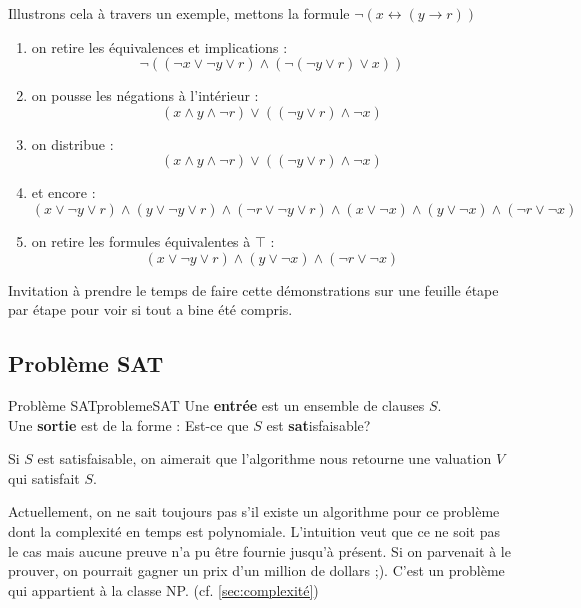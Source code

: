 \begin{example}
    Illustrons cela à travers un exemple, mettons la formule $\neg(x\leftrightarrow(y\rightarrow r))$
    \begin{enumerate}
        \item on retire les équivalences et implications :
        \begin{equation*}
            \neg((\neg x\vee\neg y \vee r)\wedge(\neg(\neg y\vee r)\vee x))
        \end{equation*}
        \item on pousse les négations à l'intérieur :
        \begin{equation*}
            (x\wedge y\wedge\neg r) \vee ((\neg y\vee r)\wedge\neg x)
        \end{equation*}
        \item on distribue : 
        \begin{equation*}
            (x\wedge y\wedge\neg r)\vee((\neg y\vee r)\wedge\neg x)
        \end{equation*}
        \item et encore : 
        \begin{equation*}
            (x\vee\neg y\vee r)\wedge(y\vee\neg y\vee r)\wedge(\neg r\vee\neg y\vee r)\wedge(x\vee\neg x)\wedge(y\vee\neg x)\wedge(\neg r\vee\neg x)
        \end{equation*}
        \item on retire les formules équivalentes à $\top$ :
        \begin{equation*}
            (x\vee\neg y\vee r)\wedge(y\vee\neg x)\wedge(\neg r\vee\neg x)
        \end{equation*}
    \end{enumerate}
    Invitation à prendre le temps de faire cette démonstrations sur une feuille étape par étape pour voir si tout a bine été compris.
\end{example}

\subsection{Problème SAT}
\begin{definition}{Problème SAT}{problemeSAT}
    Une \textbf{entrée} est un ensemble de clauses $S$. \\
    Une \textbf{sortie} est de la forme : Est-ce que $S$ est \textbf{sat}isfaisable?
\end{definition}
Si $S$ est satisfaisable, on aimerait que l'algorithme nous retourne une valuation $V$ qui satisfait $S$.
\begin{remark}
    Actuellement, on ne sait toujours pas s'il existe un algorithme pour ce problème dont la complexité en temps est polynomiale. L'intuition veut que ce ne soit pas le cas mais aucune preuve n'a pu être fournie jusqu'à présent. Si on parvenait à le prouver, on pourrait gagner un prix d'un million de dollars ;). C'est un problème qui appartient à la classe NP. (cf. \ref{sec:complexité}) 
\end{remark}

